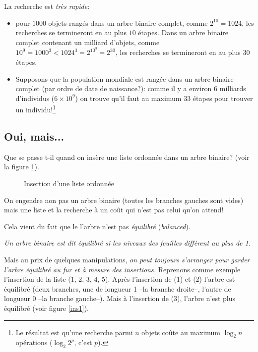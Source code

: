 La recherche est \emph{très rapide}:
\begin{itemize}
  \item pour $1000$ objets rangés dans un arbre binaire complet, comme
    $2^{10} =1024$, les recherches se termineront en au plus $10$
    étapes. Dans un arbre binaire complet contenant un milliard d'objets,
    comme  $10^9 = 1000^3 < 1024^3 = 2^{10^3} = 2^{30}$, les 
    recherches se termineront en au plus $30$ étapes. 
  \item Supposons que la population mondiale est rangée dans un arbre
    binaire complet (par ordre de date de naissance?): comme il y a
    environ 6 milliards d'individus  ($6 \times 10^9$) on trouve qu'il faut
    au maximum 33 étapes pour trouver un individu!\footnote{Le
      résultat est qu'une recherche parmi $n$ objets coûte au maximum
      $\log_2 n$ opérations ($\log_2 2^p$, c'est $p$).}
\end{itemize}
\subsection{Oui, mais...}
Que se passe t-il quand on insère une liste ordonnée dans un arbre
binaire? (voir la figure \ref{ordo}).

\begin{center}
\begin{figure}
\caption{Insertion d'une liste ordonnée}
\label{ordo}
\end{figure}
\end{center}

On engendre non pas un arbre binaire (toutes les branches gauches sont
vides) mais une liste et la recherche à un coût qui n'est pas celui
qu'on attend!

Cela vient du fait que le l'arbre n'est pas \emph{équilibré} (\emph{balanced}).

\emph{Un arbre binaire est dit équilibré si les niveaux des feuilles
  diffèrent au plus de 1.}\smallskip

Mais au prix de quelques manipulations, \emph{on peut toujours
  s'arranger pour garder 
  l'arbre équilibré au fur et à mesure 
des insertions.} Reprenons comme exemple l'insertion de la liste (1, 2,
3, 4, 5). Après l'insertion de (1) et (2) l'arbre est équilibré (deux
branches, une de longueur 1 --la branche droite--, l'autre de longueur 0
--la branche gauche--). Mais à l'insertion de (3), l'arbre n'est plus
équilibré (voir figure \ref{ins1}).

